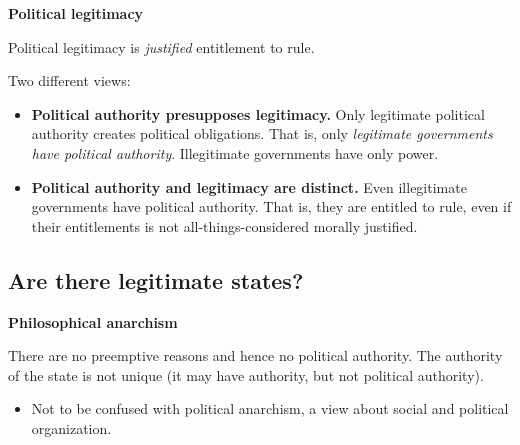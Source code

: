 \textbf{Political legitimacy}

Political legitimacy is \textit{justified} entitlement to rule.

Two different views:
\begin{itemize}
    \item \textbf{Political authority presupposes legitimacy.}
    Only legitimate political authority creates political obligations.
    That is, only \textit{legitimate governments have political authority}.
    Illegitimate governments have only power.
    \item \textbf{Political authority and legitimacy are distinct.}
    Even illegitimate governments have political authority. That is, they
    are entitled to rule, even if their entitlements is not
    all-things-considered morally justified.
\end{itemize}

\subsection{Are there legitimate states?}

\textbf{Philosophical anarchism}

There are no preemptive reasons and hence no political authority. The
authority of the state is not unique (it may have authority, but not
political authority).

\begin{itemize}
    \item Not to be confused with political anarchism, a view about social
    and political organization.
\end{itemize}